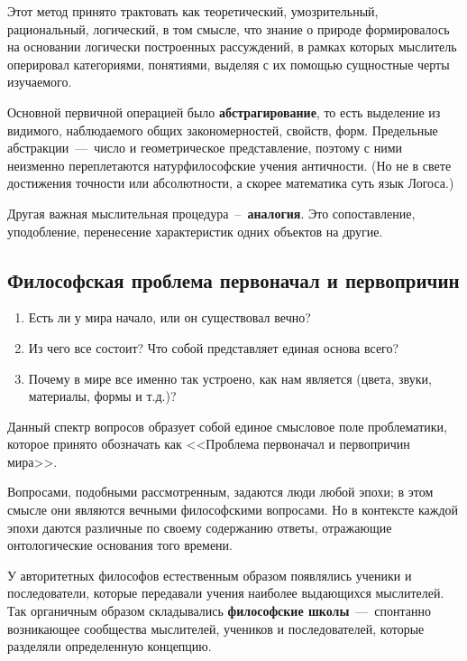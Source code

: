 \begin{enumerate}
Этот метод принято трактовать как теоретический, умозрительный, рациональный, логический, в том смысле, что знание о природе формировалось на основании логически
построенных рассуждений, в рамках которых мыслитель оперировал категориями,
понятиями, выделяя с их помощью сущностные черты изучаемого. 

Основной первичной операцией было \textbf{абстрагирование}, то есть выделение из видимого, наблюдаемого общих закономерностей, свойств, форм. Предельные абстракции~---~число и геометрическое представление, поэтому с ними неизменно переплетаются натурфилософские учения античности. (Но не в свете достижения точности или абсолютности, а скорее математика суть язык Логоса.)

Другая важная мыслительная процедура~--~\textbf{аналогия}. Это сопоставление, уподобление, перенесение характеристик одних объектов на другие.
\end{enumerate}

\subsection{Философская проблема первоначал и первопричин}

\begin{enumerate}
    \item Есть ли у мира начало, или он существовал вечно?
    \item Из чего все состоит? Что собой представляет единая основа всего?
    \item Почему в мире все именно так устроено, как нам является (цвета, звуки, материалы, формы и т.д.)?
\end{enumerate}
Данный спектр вопросов образует собой единое смысловое поле проблематики, которое принято обозначать как <<Проблема первоначал и первопричин мира>>. 

Вопросами, подобными рассмотренным, задаются люди любой эпохи; в этом смысле они являются вечными философскими вопросами. Но в контексте каждой эпохи даются различные по своему содержанию ответы, отражающие онтологические основания того времени.


У авторитетных философов естественным образом появлялись ученики и
последователи, которые передавали учения наиболее выдающихся мыслителей. Так
органичным образом складывались \textbf{философские школы}~---~спонтанно возникающее сообщества мыслителей, учеников и последователей, которые разделяли определенную концепцию. 

